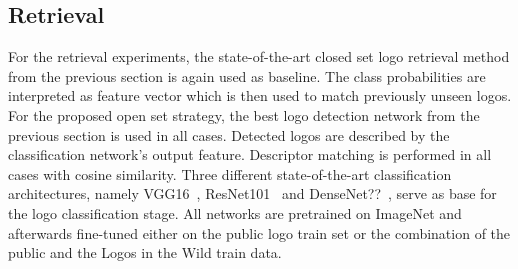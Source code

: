 \documentclass[a4paper,twoside]{article}
\begin{document}
\subsection{Retrieval}
%
For the retrieval experiments, the state-of-the-art closed set logo retrieval method from the previous section is again used as baseline. The class probabilities are interpreted as feature vector which is then used to match previously unseen logos.
For the proposed open set strategy, the best logo detection network from the previous section is used in all cases. Detected logos are described by the classification network's output feature. Descriptor matching is performed in all cases with cosine similarity. Three different state-of-the-art classification architectures, namely VGG16~\cite{simonyan2014}, ResNet101~\cite{he2015} and DenseNet??~\cite{huang2016}, serve as base for the logo classification stage. All networks are pretrained on ImageNet and afterwards fine-tuned either on the public logo train set or the combination of the public and the Logos in the Wild train data.
\end{document}
